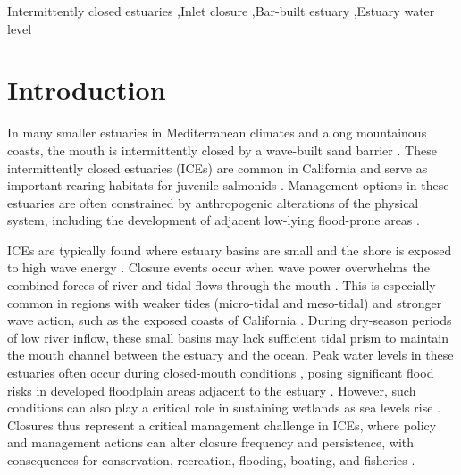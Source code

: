 \documentclass[preprint,12pt,authoryear]{elsarticle}
\begin{document}
\begin{frontmatter}
\begin{keyword}
Intermittently closed estuaries \sep  Inlet closure \sep  Bar-built estuary \sep  Estuary water level
\end{keyword}

\end{frontmatter}

\section{Introduction}
\label{sec:intro}

In many smaller estuaries in Mediterranean climates and along mountainous coasts, the mouth is intermittently closed by a wave-built sand barrier \citep{mcsweeney2017intermittently, largier2023recognizing}.
These intermittently closed estuaries (ICEs) are common in California
\citep{heady2015assessing} and serve as important rearing habitats for juvenile salmonids \citep{bond2008marine, heady2015assessing, huber2020environmental}. Management options in these estuaries are often constrained by anthropogenic alterations of the physical system, including the development of adjacent low-lying flood-prone areas \citep{largier2019considerations}.

ICEs are typically found where estuary basins are small and the shore is exposed to high wave energy \citep{cooper2001geomorphological}. Closure events occur when wave power overwhelms the combined forces of river and tidal flows through the mouth \citep{behrens2013episodic, behrens2015quantified}.  This  is especially common in regions with weaker tides (micro-tidal and meso-tidal) and stronger wave action, such as the exposed coasts of California
\citep{mcsweeney2017intermittently}.
During dry-season periods of low river inflow, these small basins may lack sufficient tidal prism to maintain the mouth channel between the estuary and the ocean.
Peak water levels in these estuaries often occur during closed-mouth conditions \citep{booysen2020methods}, posing significant flood risks in developed floodplain areas adjacent to the estuary \citep{clark2019systematic}. However, such conditions can also play a critical role in sustaining wetlands as sea levels rise \citep{thorne2021wetlands}. Closures thus represent a critical management challenge in ICEs, where policy and management actions can alter closure frequency and persistence, with consequences for conservation, recreation, flooding, boating, and fisheries \citep{stein2021advancing}.
\end{document}
